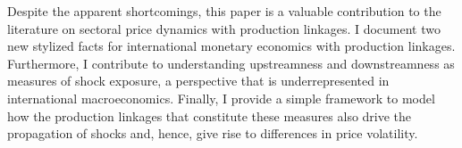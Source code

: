 Despite the apparent shortcomings, this paper is a valuable contribution to the literature on sectoral price dynamics with 
production linkages. I document two new stylized facts for international monetary economics with production linkages. Furthermore, I 
contribute to understanding upstreamness and downstreamness as measures of shock exposure, a perspective that is underrepresented 
in international macroeconomics. Finally, I provide a simple framework to model how the production linkages that constitute these measures
also drive the propagation of shocks and, hence, give rise to differences in price volatility.
